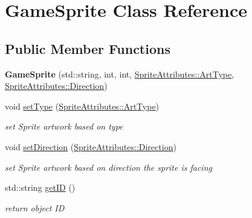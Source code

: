 \hypertarget{class_game_sprite}{}\section{Game\+Sprite Class Reference}
\label{class_game_sprite}
\subsection*{Public Member Functions}
\begin{DoxyCompactItemize}
\item 
\mbox{\label{class_game_sprite_af69f5152c856a2e4a8ca8b1a9c975e18}} 
{\bfseries Game\+Sprite} (std\+::string, int, int, \mbox{\hyperlink{namespace_sprite_attributes_afb5447c311bc29f0ce8ddfd025c6e998}{Sprite\+Attributes\+::\+Art\+Type}}, \mbox{\hyperlink{namespace_sprite_attributes_a81213e7721058c470f8001d9d7351608}{Sprite\+Attributes\+::\+Direction}})
\item 
\mbox{\label{class_game_sprite_a58f1b3fce8064be9921bd37869e9b117}} 
void \mbox{\hyperlink{class_game_sprite_a58f1b3fce8064be9921bd37869e9b117}{set\+Type}} (\mbox{\hyperlink{namespace_sprite_attributes_afb5447c311bc29f0ce8ddfd025c6e998}{Sprite\+Attributes\+::\+Art\+Type}})
\begin{DoxyCompactList}\small\item\em set Sprite artwork based on type \end{DoxyCompactList}\item 
\mbox{\label{class_game_sprite_ab21959131c105ec6e29201d5a0843f7a}} 
void \mbox{\hyperlink{class_game_sprite_ab21959131c105ec6e29201d5a0843f7a}{set\+Direction}} (\mbox{\hyperlink{namespace_sprite_attributes_a81213e7721058c470f8001d9d7351608}{Sprite\+Attributes\+::\+Direction}})
\begin{DoxyCompactList}\small\item\em set Sprite artwork based on direction the sprite is facing \end{DoxyCompactList}\item 
\mbox{\label{class_game_sprite_af059d86061f19675bebb8126a592a9e1}} 
std\+::string \mbox{\hyperlink{class_game_sprite_af059d86061f19675bebb8126a592a9e1}{get\+ID}} ()
\begin{DoxyCompactList}\small\item\em return object ID \end{DoxyCompactList}\item 

\end{DoxyCompactItemize}
